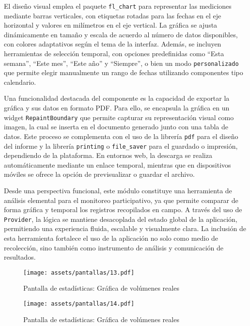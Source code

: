 El diseño visual emplea el paquete \texttt{fl\_chart} para representar las mediciones mediante barras verticales, con etiquetas rotadas para las fechas en el eje horizontal y valores en milímetros en el eje vertical. La gráfica se ajusta dinámicamente en tamaño y escala de acuerdo al número de datos disponibles, con colores adaptativos según el tema de la interfaz. Además, se incluyen herramientas de selección temporal, con opciones predefinidas como ``Esta semana'', ``Este mes'', ``Este año'' y ``Siempre'', o bien un modo \texttt{personalizado} que permite elegir manualmente un rango de fechas utilizando componentes tipo calendario.

Una funcionalidad destacada del componente es la capacidad de exportar la gráfica y sus datos en formato PDF. Para ello, se encapsula la gráfica en un widget \texttt{RepaintBoundary} que permite capturar su representación visual como imagen, la cual se inserta en el documento generado junto con una tabla de datos. Este proceso se complementa con el uso de la librería \texttt{pdf} para el diseño del informe y la librería \texttt{printing} o \texttt{file\_saver} para el guardado o impresión, dependiendo de la plataforma. En entornos web, la descarga se realiza automáticamente mediante un enlace temporal, mientras que en dispositivos móviles se ofrece la opción de previsualizar o guardar el archivo.

Desde una perspectiva funcional, este módulo constituye una herramienta de análisis elemental para el monitoreo participativo, ya que permite comparar de forma gráfica y temporal los registros recopilados en campo. A través del uso de \texttt{Provider}, la lógica se mantiene desacoplada del estado global de la aplicación, permitiendo una experiencia fluida, escalable y visualmente clara. La inclusión de esta herramienta fortalece el uso de la aplicación no solo como medio de recolección, sino también como instrumento de análisis y comunicación de resultados.



\begin{figure}[h!]
\centering
  \texttt{[image: assets/pantallas/13.pdf]}
  \caption{Pantalla de estadísticas: Gráfica de volúmenes reales }
  \label{pantallas13}
\end{figure}


\begin{figure}[h!]
\centering
  \texttt{[image: assets/pantallas/14.pdf]}
  \caption{Pantalla de estadísticas: Gráfica de volúmenes reales }
  \label{pantallas14}
\end{figure}

